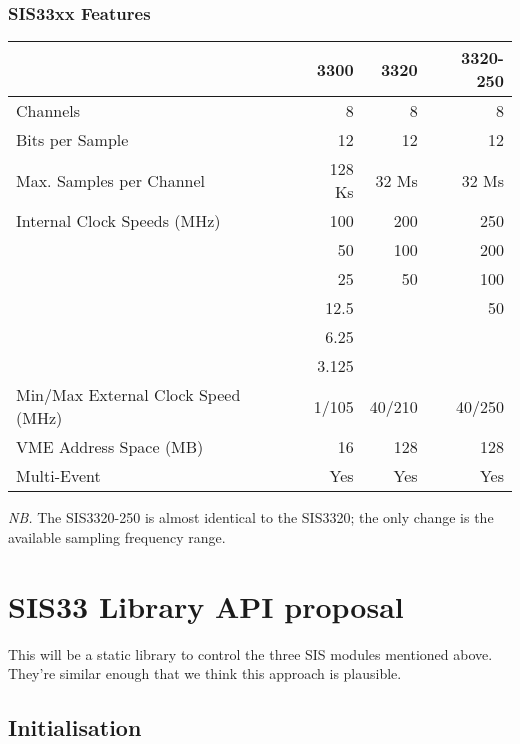 \documentclass[12pt,a4paper]{article}
\begin{document}
\subsubsection*{SIS33xx Features}
\label{sec-1.2.1}


\begin{center}
  \begin{tabular}{lrrr}
    \hline
    &    3300  &    3320  &  3320-250  \\
    \hline
    Channels                            &       8  &       8  &         8  \\
    Bits per Sample                     &      12  &      12  &        12  \\
    Max. Samples per Channel            &  128 Ks  &   32 Ms  &     32 Ms  \\
    Internal Clock Speeds (MHz)         &     100  &     200  &       250  \\
    &      50  &     100  &       200  \\
    &      25  &      50  &       100  \\
    &    12.5  &          &        50  \\
    &    6.25  &          &            \\
    &   3.125  &          &            \\
    Min/Max External Clock Speed (MHz)  &   1/105  &  40/210  &    40/250  \\
    VME Address Space (MB)              &      16  &     128  &       128  \\
    Multi-Event                         &     Yes  &     Yes  &       Yes  \\
    \hline
  \end{tabular}
\end{center}



\emph{NB.} The SIS3320-250 is almost identical to the SIS3320; the only change
is the available sampling frequency range.

\section*{SIS33 Library API proposal}
\label{sec-2}

This will be a static library to control the three SIS modules mentioned
above. They're similar enough that we think this approach is plausible.

\subsection*{Initialisation}
\label{sec-2.1}
\end{document}

